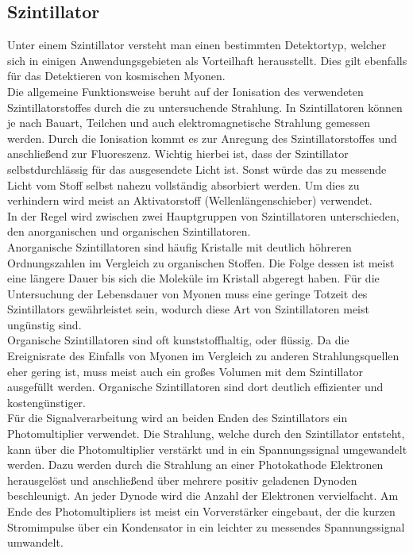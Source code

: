 \subsection{Szintillator}
\label{szin}
Unter einem Szintillator versteht man einen bestimmten Detektortyp, welcher sich in einigen Anwendungsgebieten als Vorteilhaft herausstellt. Dies gilt ebenfalls für das
Detektieren von kosmischen Myonen. 
\\
Die allgemeine Funktionsweise beruht auf der Ionisation des verwendeten Szintillatorstoffes durch die zu untersuchende Strahlung. In Szintillatoren können je nach Bauart, Teilchen und auch elektromagnetische Strahlung 
gemessen werden. Durch die Ionisation kommt es zur Anregung des Szintillatorstoffes und anschließend zur Fluoreszenz. Wichtig hierbei ist, dass der Szintillator selbstdurchlässig für das ausgesendete Licht ist. Sonst würde
das zu messende Licht vom Stoff selbst nahezu vollständig absorbiert werden. Um dies zu verhindern wird meist an Aktivatorstoff (Wellenlängenschieber) verwendet.
\\
In der Regel wird zwischen zwei Hauptgruppen von Szintillatoren unterschieden, den anorganischen und organischen Szintillatoren.
\\
\newline
Anorganische Szintillatoren sind häufig Kristalle mit deutlich höhreren Ordnungszahlen im Vergleich zu organischen Stoffen. Die Folge dessen ist
meist eine längere Dauer bis sich die Moleküle im Kristall abgeregt haben. Für die Untersuchung der Lebensdauer von Myonen muss eine geringe Totzeit des
Szintillators gewährleistet sein, wodurch diese Art von Szintillatoren meist ungünstig sind.
\\
\newline
Organische Szintillatoren sind oft kunststoffhaltig, oder flüssig. Da die Ereignisrate des Einfalls von Myonen im Vergleich zu anderen Strahlungsquellen eher gering ist, muss meist
auch ein großes Volumen mit dem Szintillator ausgefüllt werden. Organische Szintillatoren sind dort deutlich effizienter und kostengünstiger.
\\
\newline
Für die Signalverarbeitung wird an beiden Enden des Szintillators ein Photomultiplier verwendet. 
Die Strahlung, welche durch den Szintillator entsteht, kann über die Photomultiplier verstärkt und in ein Spannungssignal umgewandelt werden. Dazu werden 
durch die Strahlung an einer Photokathode Elektronen herausgelöst und anschließend über mehrere positiv geladenen Dynoden 
beschleunigt. An jeder Dynode wird die Anzahl der Elektronen 
vervielfacht. Am Ende des Photomultipliers ist meist ein Vorverstärker eingebaut, der die kurzen Stromimpulse über ein Kondensator in ein leichter zu messendes Spannungssignal umwandelt.

